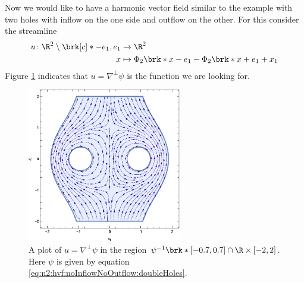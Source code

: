 Now we would like to have a harmonic vector field similar to the example with two holes with
inflow on the one side and outflow on the other. 
For this consider the streamline
\begin{equation}
  \begin{aligned}
  u\colon\R^2\setminus\brk[c]*{-e_1,e_1}&\to\R^2 \\
  x&\mapsto\Phi_2\brk*{x-e_1}-\Phi_2\brk*{x+e_1}+x_1
  \end{aligned}\label{eq:n2:hvf:noInflowNoOutflow:doubleHoles}
\end{equation}
Figure \ref{pl:n2_hvf_InflowOutflow_symmetric_region} indicates that $u=\nabla^\perp\psi$ is the function
we are looking for.
\begin{figure}
  \centering
  \includegraphics[width=0.6\textwidth]{../Plots/HarmonicVectorFields_gr2.eps}
  \caption{A plot of $u=\nabla^\perp\psi$ in the region $\psi^{-1}\brk*{[-0.7,0.7]}\cap \R\times[-2,2]$.
  Here $\psi$ is given by equation \eqref{eq:n2:hvf:noInflowNoOutflow:doubleHoles}.}
  \label{pl:n2_hvf_InflowOutflow_symmetric_region}
\end{figure}


